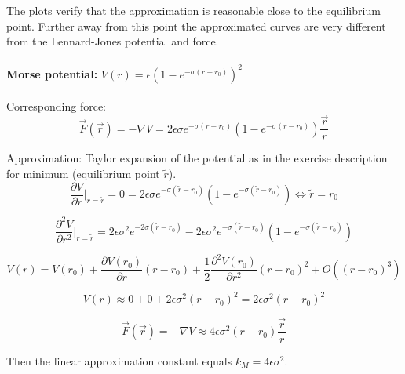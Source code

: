 \documentclass[11pt]{article}
\begin{document}
 The plots verify that the approximation is reasonable close to the equilibrium point. Further away from this point the approximated curves are very different from the Lennard-Jones potential and force.
 \\
 \\
\textbf{Morse potential:}  $ V(r) = \epsilon \left(1-e^{-\sigma(r-r_0)}\right)^2$
 \\
 \\
 Corresponding force:
\[ \vec{F}(\vec{r}) = - \nabla V = 2 \epsilon \sigma e^{-\sigma(r-r_0)} \left(1-e^{-\sigma(r-r_0)}\right) \frac{\vec{r}}{r} \]
  
Approximation: Taylor expansion of the potential as in the exercise description for minimum (equilibrium point $\tilde{r}$).
\[ \frac{\partial V}{\partial r}\bigg|_{r=\tilde{r}} = 0 = 2 \epsilon \sigma e^{-\sigma(\tilde{r}-r_0)} \left(1-e^{-\sigma(\tilde{r}-r_0)}\right) \Leftrightarrow \tilde{r} = r_0 \]

\[ \frac{\partial^2 V}{\partial r^2}\bigg|_{r = \tilde{r}} = 2\epsilon\sigma^2 e^{-2 \sigma (\tilde{r}-r_0)} - 2 \epsilon \sigma^2 e^{-\sigma(\tilde{r}-r_0)} \left(1-e^{-\sigma(\tilde{r}-r_0)}\right) \]

\[ V(r) = V(r_0) + \frac{\partial V(r_0)}{\partial r}(r-r_0) + \frac{1}{2} \frac{\partial^2 V(r_0)}{\partial r^2}(r-r_0)^2 + O((r-r_0)^3) \]

\[ V(r) \approx 0 + 0 + 2 \epsilon \sigma^2 (r-r_0)^2 = 2 \epsilon \sigma^2 (r-r_0)^2 \]

\[ \vec{F}(\vec{r}) = - \nabla V \approx 4 \epsilon \sigma^2 (r-r_0) \frac{\vec{r}}{r} \]


Then the linear approximation constant equals $k_M = 4 \epsilon \sigma^2$.
\end{document}
